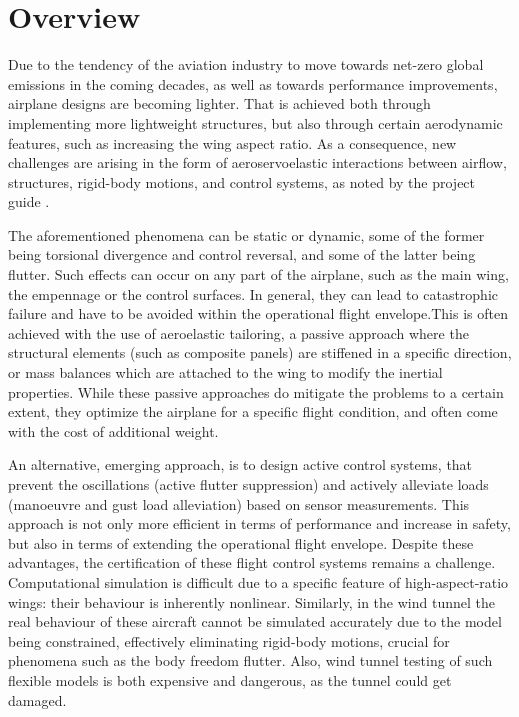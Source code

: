 

\chapter{Overview}
Due to the tendency of the aviation industry to move towards net-zero global emissions in the coming decades, as well as towards performance improvements, airplane designs are becoming lighter. That is achieved both through implementing more lightweight structures, but also through certain aerodynamic features, such as increasing the wing aspect ratio. As a consequence, new challenges are arising in the form of aeroservoelastic interactions between airflow, structures, rigid-body motions, and control systems, as noted by the project guide \cite{Castro2026}. 

The aforementioned phenomena can be static or dynamic, some of the former being torsional divergence and control reversal, and some of the latter being flutter. Such effects can occur on any part of the airplane, such as the main wing, the empennage or the control surfaces. In general, they can lead to catastrophic failure and have to be avoided within the operational flight envelope.This is often achieved with the use of aeroelastic tailoring, a passive approach where the structural elements (such as composite panels) are stiffened in a specific direction, or mass balances which are attached to the wing to modify the inertial properties. While these passive approaches do mitigate the problems to a certain extent, they optimize the airplane for a specific flight condition, and often come with the cost of additional weight.

An alternative, emerging approach, is to design active control systems, that prevent the oscillations (active flutter suppression) and actively alleviate loads (manoeuvre and gust load alleviation) based on sensor measurements. This approach is not only more efficient in terms of performance and increase in safety, but also in terms of extending the operational flight envelope. Despite these advantages, the certification of these flight control systems remains a challenge. Computational simulation is difficult due to a specific feature of high-aspect-ratio wings: their behaviour is inherently nonlinear. Similarly, in the wind tunnel the real behaviour of these aircraft cannot be simulated accurately due to the model being constrained, effectively eliminating rigid-body motions, crucial for phenomena such as the body freedom flutter. Also, wind tunnel testing of such flexible models is both expensive and dangerous, as the tunnel could get damaged.

